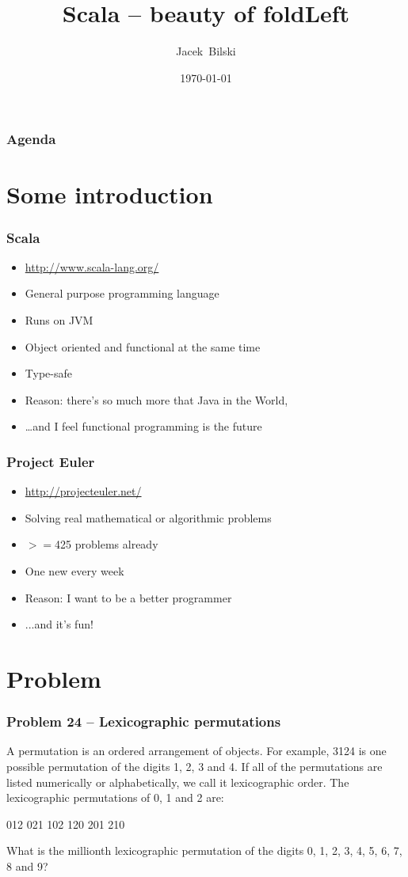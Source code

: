 \documentclass[xcolor=dvipsnames]{beamer}
\title{Scala -- beauty of foldLeft}
\author{Jacek~Bilski}
\date{\today}
\begin{document}
\begin{frame}
\titlepage
\end{frame}

\begin{frame}
\frametitle{Agenda}
\tableofcontents[pausesections]
\end{frame}


\section{Some introduction}

\begin{frame}
\frametitle{Scala}
\begin{itemize}
\item \href{http://www.scala-lang.org/}{http://www.scala-lang.org/}
\item General purpose programming language
\item Runs on JVM
\item Object oriented and functional at the same time
\item Type-safe
\item Reason: there's so much more that Java in the World,
\item \ldots{}and I feel functional programming is the future
\end{itemize}
\end{frame}

\begin{frame}
\frametitle{Project Euler}
\begin{itemize}
\item \href{http://projecteuler.net/}{http://projecteuler.net/}
\item Solving real mathematical or algorithmic problems
\item $>=$425 problems already
\item One new every week
\item Reason: I want to be a better programmer
\item ...and it's fun!
\end{itemize}
\end{frame}

\section{Problem}

\begin{frame}
\frametitle{Problem 24 -- Lexicographic permutations}
A permutation is an ordered arrangement of objects. For example, 3124 is one possible permutation of the digits 1, 2, 3 and 4. If all of the permutations are listed numerically or alphabetically, we call it lexicographic order. The lexicographic permutations of 0, 1 and 2 are:

012   021   102   120   201   210

What is the millionth lexicographic permutation of the digits 0, 1, 2, 3, 4, 5, 6, 7, 8 and 9?
\end{frame}
\end{document}
